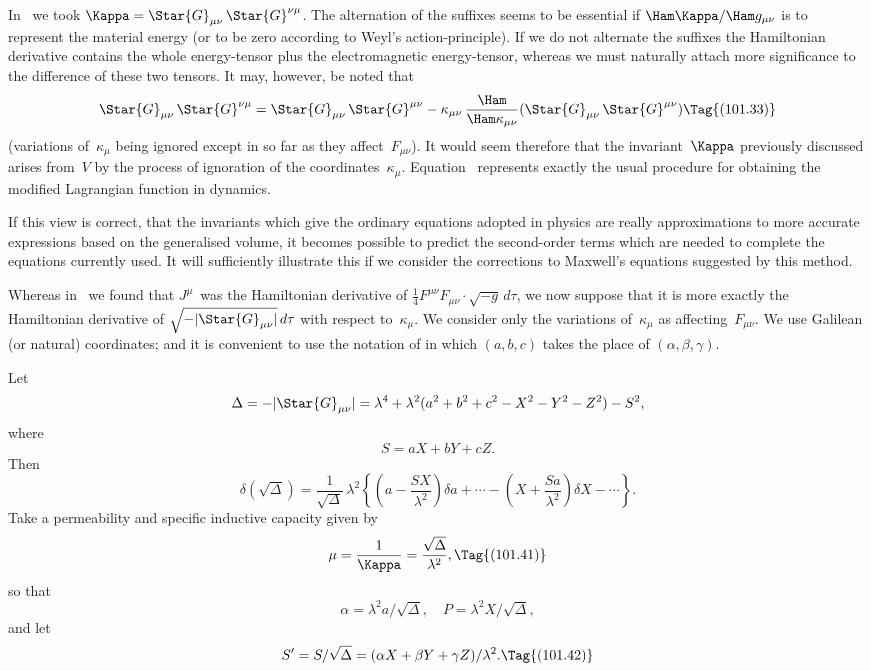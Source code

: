 \documentclass[12pt]{book}
\begin{document}
In~ we took $\Kappa = \Star{G}_{\mu\nu}\, \Star{G}^{\nu\mu}$. The alternation of the suffixes seems to
be essential if $\Ham\Kappa/\Ham g_{\mu\nu}$ is to represent the material energy (or to be zero
according to Weyl's action-principle). If we do not alternate the suffixes the
Hamiltonian derivative contains the whole energy-tensor plus the electromagnetic
energy-tensor, whereas we must naturally attach more significance
to the difference of these two tensors. It may, however, be noted that
\[
\Star{G}_{\mu\nu}\, \Star{G}^{\nu\mu}
= \Star{G}_{\mu\nu}\, \Star{G}^{\mu\nu}
- \kappa_{\mu\nu}\, \frac{\Ham}{\Ham\kappa_{\mu\nu}}(\Star{G}_{\mu\nu}\, \Star{G}^{\mu\nu})
\Tag{(101.33)}
\]
(variations of~$\kappa_{\mu}$ being ignored except in so far as they affect~$F_{\mu\nu}$). It would
%
seem therefore that the invariant~$\Kappa$ previously discussed arises from~$V$ by the
process of ignoration of the coordinates~$\kappa_{\mu}$. Equation~ represents
exactly the usual procedure for obtaining the modified Lagrangian function in
%
dynamics.

If this view is correct, that the invariants which give the ordinary equations
adopted in physics are really approximations to more accurate expressions
based on the generalised volume, it becomes possible to predict the second-order
terms which are needed to complete the equations currently used. It
will sufficiently illustrate this if we consider the corrections to Maxwell's
equations suggested by this method.

Whereas in~ we found that $J^{\mu}$~was the Hamiltonian derivative of
$\frac{1}{4} F^{\mu\nu} F_{\mu\nu} \cdot \sqrt{-g}\, d\tau$, we now suppose that it is more exactly the Hamiltonian
derivative of $\sqrt{-|\Star{G}_{\mu\nu}|}\, d\tau$ with respect to~$\kappa_{\mu}$\footnotemark.\footnotetext
  {We consider only the variations of~$\kappa_{\mu}$ as affecting~$F_{\mu\nu}$.}
We use Galilean (or natural)
coordinates; and it is convenient to use the notation of  in which $(a, b, c)$
takes the place of $(\alpha, \beta, \gamma)$.

Let
\[
\Delta = -|\Star{G}_{\mu\nu}|
= \lambda^{4} + \lambda^{2} (a^{2} + b^{2} + c^{2} - X^{2} - Y^{2} - Z^{2}) - S^{2},
\]
where
\[
S = aX + bY + cZ.
\]
Then
\[
\delta(\sqrt{\Delta})
= \frac{1}{\sqrt{\Delta}}\, \lambda^{2} \left\{
\left(a - \frac{SX}{\lambda^{2}}\right) \delta a + \cdots
- \left(X + \frac{Sa}{\lambda^{2}}\right) \delta X - \cdots\right\}.
\]
Take a permeability and specific inductive capacity given by
%
\[
\mu = \frac{1}{\Kappa} = \frac{\sqrt{\Delta}}{\lambda^{2}},
\Tag{(101.41)}
\]
so that
\[
\alpha = \lambda^{2}a/\sqrt{\Delta},\quad
P = \lambda^{2}X/\sqrt{\Delta},
\]
and let
\[
S' = S/\sqrt{\Delta}
= (\alpha X + \beta Y + \gamma Z)/\lambda^{2}.
\Tag{(101.42)}
\]
\end{document}
